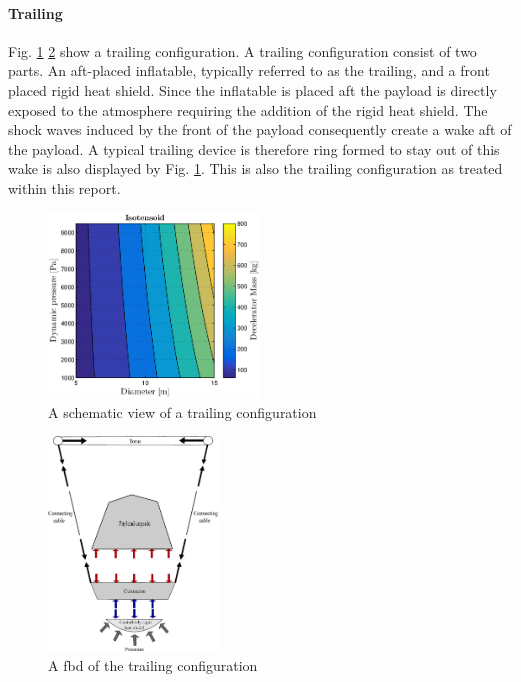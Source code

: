 \paragraph{Trailing}

Fig. \ref{fig:conc_trailing} \ref{fig:fbd_trailing} show a trailing configuration. A trailing configuration consist of two parts. An aft-placed inflatable, typically referred to as the trailing, and a front placed rigid heat shield. Since the inflatable is placed aft the payload is directly exposed to the atmosphere requiring the addition of the rigid heat shield. The shock waves induced by the front of the payload consequently create a wake aft of the payload. A typical trailing device is therefore ring formed to stay out of this wake is also displayed by Fig. \ref{fig:conc_trailing}. This is also the trailing configuration as treated within this report.

\begin{figure}[H]
\centering
\includegraphics[width = 0.5\textwidth]{Figure/ISO_comp.eps}
\caption{A schematic view of a trailing configuration}
\label{fig:conc_trailing}
\end{figure}

\begin{figure}[H]
\centering
\includegraphics[width = 0.4\textwidth]{Figure/FBD_trailing.eps}
\caption{A \gls{fbd} of the trailing configuration}
\label{fig:fbd_trailing}
\end{figure}

